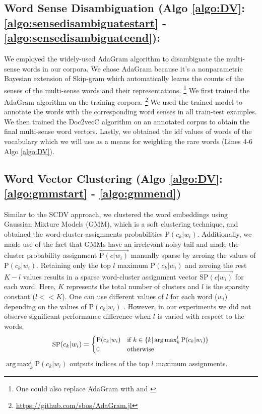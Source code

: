 \documentclass{ecai}
\DeclareMathOperator*{\argmax}{arg\,max}
\begin{document}
\subsection{Word Sense Disambiguation (Algo \ref{algo:DV}: \ref{algo:sensedisambiguatestart} - \ref{algo:sensedisambiguateend}):}
\label{algo:wsd}
We employed the widely-used AdaGram \cite{bartunov2016breaking} algorithm to disambiguate the multi-sense words in our corpora. We chose AdaGram because it's a nonparametric Bayesian extension of Skip-gram which automatically learns the counts of the senses of the multi-sense words and their representations. \footnote{One could also replace AdaGram with \cite{dai2017mixture} and \cite{athiwaratkun2018probabilistic}} We first trained the AdaGram algorithm on the training corpora. \footnote{ \url{https://github.com/sbos/AdaGram.jl}} We used the trained model to annotate the words with the corresponding word senses in all train-test examples. We then trained the Doc2vecC algorithm on an annotated corpus to obtain the final multi-sense word vectors. Lastly, we obtained the idf values of words of the vocabulary which we will use as a means for weighting the rare words (Lines 4-6 Algo \ref{algo:DV}).

\subsection{Word Vector Clustering (Algo \ref{algo:DV}: \ref{algo:gmmstart} - \ref{algo:gmmend})}
\label{algo:wvc}
Similar to the SCDV approach, we clustered the word embeddings using Gaussian Mixture Models (GMM), which is a soft clustering technique, and obtained the word-cluster assignments probabilities P$(c_{k}|w_{i})$.  Additionally, we made use of the fact that GMMs have an irrelevant noisy tail and made the cluster probability assignment $\vec{\text{P}(c|w_{i})}$ manually sparse by zeroing the values of P$(c_{k}|w_{i})$. Retaining only the top $l$ maximum P$(c_{k}|w_{i})$ and zeroing the rest $K-l$ values results in a sparse word-cluster assignment vector $\vec{\text{SP}(c|w_{i})}$ for each word. Here, $K$ represents the total number of clusters and $l$ is the sparsity constant ($l<<K$). One can use different values of $l$ for each word ($w_i$) depending on the values of P$(c_{k}|w_{i})$ . However, in our experiments we did not observe significant performance difference when $l$ is varied with respect to the words. 
\begin{equation}
\small
\text{SP}(c_k|w_{i}) = 
\begin{cases}
\text{P}(c_{k}|w_{i}) & \text{if } k \in \{k | \argmax_k^l{{\text{P}(c_{k}|w_{i})}}\} \\ 0 & \text{otherwise}
\end{cases}
\end{equation}
$ \argmax_k^l{{\text{P}(c_{k}|w_{i})}}$ outputs indices of the top $l$ maximum assignments.
\end{document}
